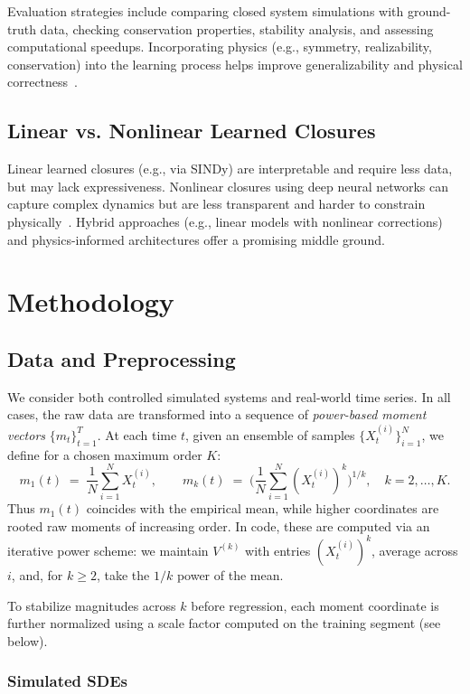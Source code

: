 \documentclass[journal, onecolumn]{IEEEtran}
\begin{document}
Evaluation strategies include comparing closed system simulations with ground-truth data, checking conservation properties, stability analysis, and assessing computational speedups. Incorporating physics (e.g., symmetry, realizability, conservation) into the learning process helps improve generalizability and physical correctness~\cite{karniadakis2021physics}.


\subsection{Linear vs. Nonlinear Learned Closures}

Linear learned closures (e.g., via SINDy) are interpretable and require less data, but may lack expressiveness. Nonlinear closures using deep neural networks can capture complex dynamics but are less transparent and harder to constrain physically~\cite{brunton2016discovering, karniadakis2021physics}. Hybrid approaches (e.g., linear models with nonlinear corrections) and physics-informed architectures offer a promising middle ground.

\section{Methodology}
\label{sec:methodology}

\subsection{Data and Preprocessing}
We consider both controlled simulated systems and real-world time series. In all cases,
the raw data are transformed into a sequence of \emph{power-based moment vectors}
$\{m_t\}_{t=1}^T$. At each time $t$, given an ensemble of samples
$\{X_t^{(i)}\}_{i=1}^N$, we define for a chosen maximum order $K$:
\[
m_1(t) \;=\; \frac{1}{N} \sum_{i=1}^N X_t^{(i)},
\qquad
m_k(t) \;=\; \Big( \frac{1}{N} \sum_{i=1}^N (X_t^{(i)})^k \Big)^{1/k},
\quad k = 2,\dots,K.
\]
Thus $m_1(t)$ coincides with the empirical mean, while higher coordinates are
rooted raw moments of increasing order. In code, these are computed via an
iterative power scheme:
we maintain $V^{(k)}$ with entries $(X_t^{(i)})^k$, average across $i$,
and, for $k \ge 2$, take the $1/k$ power of the mean.

To stabilize magnitudes across $k$ before regression, each moment coordinate
is further normalized using a scale factor computed on the training segment
(see below).
\medskip
\subsubsection{Simulated SDEs}
\end{document}
